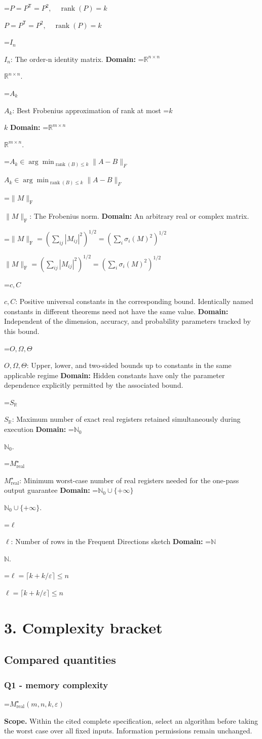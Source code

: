 \documentclass[10pt,a4paper]{article}
\newcommand{\AtlasMath}[1]{\par\begingroup\centering\setbox0=\hbox{$\displaystyle #1$}\ifdim\wd0>1.4\linewidth\typeout{ATLAS WIDE FORMULA: \the\wd0}\fi\ifdim\wd0>\linewidth\resizebox{\linewidth}{!}{\box0}\else\box0\fi\par\endgroup}
\newcommand{\AtlasInlineMath}[1]{\begingroup\setbox0=\hbox{$#1$}\ifdim\wd0>.4\linewidth\endgroup\AtlasMath{#1}\else\endgroup$#1$\fi}
\begin{document}
\AtlasInlineMath{P=P^{\mathsf T}=P^2,\quad\operatorname{rank}(P)=k}

\AtlasInlineMath{I_n}: The order-n identity matrix. \textbf{Domain:} \AtlasInlineMath{\mathbb R^{n\times n}}.

\AtlasInlineMath{A_k}: Best Frobenius approximation of rank at most \AtlasInlineMath{k} \textbf{Domain:} \AtlasInlineMath{\mathbb R^{m\times n}}.

\AtlasInlineMath{A_k\in\arg\min_{\operatorname{rank}(B)\le k}\|A-B\|_F}

\AtlasInlineMath{\|M\|_{\mathrm F}}: The Frobenius norm. \textbf{Domain:} An arbitrary real or complex matrix.

\AtlasInlineMath{\|M\|_{\mathrm F}=(\sum_{ij}|M_{ij}|^2)^{1/2}=(\sum_i\sigma_i(M)^2)^{1/2}}

\AtlasInlineMath{c,C}: Positive universal constants in the corresponding bound. Identically named constants in different theorems need not have the same value. \textbf{Domain:} Independent of the dimension, accuracy, and probability parameters tracked by this bound.

\AtlasInlineMath{O,\Omega,\Theta}: Upper, lower, and two-sided bounds up to constants in the same applicable regime \textbf{Domain:} Hidden constants have only the parameter dependence explicitly permitted by the associated bound.

\AtlasInlineMath{S_{\mathbb R}}: Maximum number of exact real registers retained simultaneously during execution \textbf{Domain:} \AtlasInlineMath{\mathbb N_0}.

\AtlasInlineMath{M^\star_{\mathrm{real}}}: Minimum worst-case number of real registers needed for the one-pass output guarantee \textbf{Domain:} \AtlasInlineMath{\mathbb N_0\cup\{+\infty\}}.

\AtlasInlineMath{\ell}: Number of rows in the Frequent Directions sketch \textbf{Domain:} \AtlasInlineMath{\mathbb N}.

\AtlasInlineMath{\ell=\lceil k+k/\varepsilon\rceil\le n}

\section{3. Complexity bracket}
\subsection{Compared quantities}
\subsubsection{Q1 - memory complexity}
\AtlasMath{M^\star_{\mathrm{real}}(m,n,k,\varepsilon)}
\textbf{Scope.} Within the cited complete specification, select an algorithm before taking the worst case over all fixed inputs. Information permissions remain unchanged.
\end{document}
